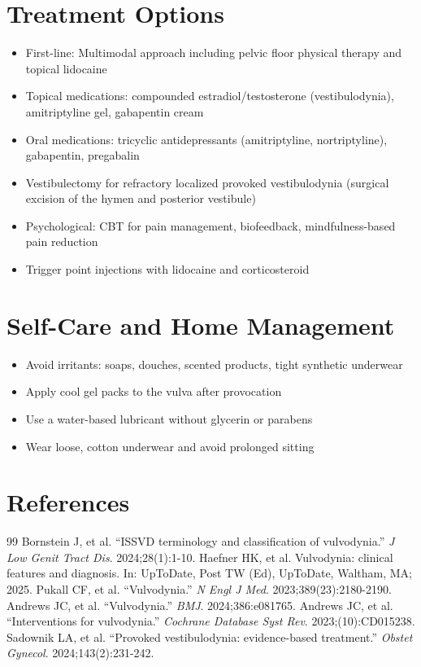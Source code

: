 \section*{Treatment Options}
\begin{itemize}
  \item First-line: Multimodal approach including pelvic floor physical therapy and topical lidocaine
  \item Topical medications: compounded estradiol/testosterone (vestibulodynia), amitriptyline gel, gabapentin cream
  \item Oral medications: tricyclic antidepressants (amitriptyline, nortriptyline), gabapentin, pregabalin
  \item Vestibulectomy for refractory localized provoked vestibulodynia (surgical excision of the hymen and posterior vestibule)
  \item Psychological: CBT for pain management, biofeedback, mindfulness-based pain reduction
  \item Trigger point injections with lidocaine and corticosteroid
\end{itemize}

\section*{Self-Care and Home Management}
\begin{itemize}
  \item Avoid irritants: soaps, douches, scented products, tight synthetic underwear
  \item Apply cool gel packs to the vulva after provocation
  \item Use a water-based lubricant without glycerin or parabens
  \item Wear loose, cotton underwear and avoid prolonged sitting
\end{itemize}

\section*{References}
\begin{thebibliography}{99}
 Bornstein J, et al. ``ISSVD terminology and classification of vulvodynia.'' \emph{J Low Genit Tract Dis}. 2024;28(1):1-10.
 Haefner HK, et al. Vulvodynia: clinical features and diagnosis. In: UpToDate, Post TW (Ed), UpToDate, Waltham, MA; 2025.
 Pukall CF, et al. ``Vulvodynia.'' \emph{N Engl J Med}. 2023;389(23):2180-2190.
 Andrews JC, et al. ``Vulvodynia.'' \emph{BMJ}. 2024;386:e081765.
 Andrews JC, et al. ``Interventions for vulvodynia.'' \emph{Cochrane Database Syst Rev}. 2023;(10):CD015238.
 Sadownik LA, et al. ``Provoked vestibulodynia: evidence-based treatment.'' \emph{Obstet Gynecol}. 2024;143(2):231-242.
\end{thebibliography}
